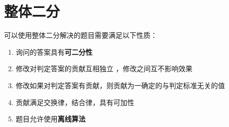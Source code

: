\section{整体二分}
\par \noindent 可以使用整体二分解决的题目需要满足以下性质：

\begin{enumerate}
\item 询问的答案具有\textbf{可二分性}
\item 修改对判定答案的贡献互相独立 ，修改之间互不影响效果
\item 修改如果对判定答案有贡献，则贡献为一确定的与判定标准无关的值
\item 贡献满足交换律，结合律，具有可加性
\item 题目允许使用\textbf{离线算法}
\end{enumerate}

